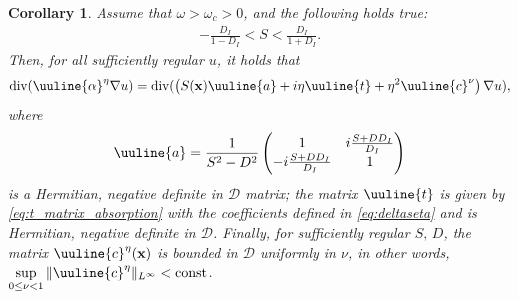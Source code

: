 \documentclass[report]{elsarticle}
\newtheorem{assumption}[theorem]{Assumption}
\newtheorem{corollary}[theorem]{Corollary}
\numberwithin{theorem}{section}
\renewcommand{\vec}[1]{\mathbf{#1}}
\begin{document}
\begin{corollary}
	Assume that $\omega>\omega_c>0$, and the following holds true:
	\begin{align}
		\label{eq:assump_var2}
		 -\frac{D_I}{1-D_I}<S<\frac{D_I}{1+D_I}.
	\end{align}
	Then, for all sufficiently regular $u$, it holds that  
	\begin{align*}
		\operatorname{div}(\uuline{\alpha}^{\eta}\nabla u)=	\operatorname{div}(\left(S(\vec{x})\uuline{a}+i\eta\uuline{t}+\eta^2\uuline{c}^{\nu}\right)\nabla u), 
	\end{align*}
	where 
	\begin{align*}
		\uuline{a}=\frac{1}{S^2-D^2}\left(
		\begin{matrix}
			1 & i\frac{S+DD_I}{D_I}\\
			-i\frac{S+DD_I}{D_I}& 1	
		\end{matrix}
		\right)
	\end{align*}
	is a Hermitian, negative definite in $\mathcal{D}$ matrix; the matrix $\uuline{t}$ is given by \eqref{eq:t_matrix_absorption} with the coefficients defined in \eqref{eq:deltaseta} and is Hermitian, negative definite in $\mathcal{D}$. Finally, for sufficiently regular $S, \, D$, the matrix $\uuline{c}^{\eta}(\vec{x})$ is bounded in $\mathcal{D}$ uniformly in $\nu$, in other words, $\sup\limits_{0\leq \nu<1}\|\uuline{c}^{\eta}\|_{L^{\infty}}<\operatorname{const}$.
\end{corollary}
\end{document}
